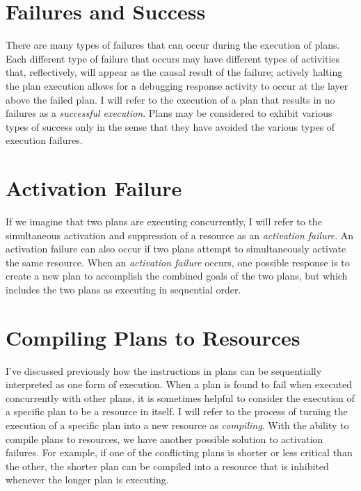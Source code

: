 \section{Failures and Success}

There are many types of failures that can occur during the execution
of plans.  Each different type of failure that occurs may have
different types of activities that, reflectively, will appear as the
causal result of the failure; actively halting the plan execution
allows for a debugging response activity to occur at the layer above
the failed plan.  I will refer to the execution of a plan that results
in no failures as a \emph{successful execution}.  Plans may be
considered to exhibit various types of success only in the sense that
they have avoided the various types of execution failures.

\section{Activation Failure}

If we imagine that two plans are executing concurrently, I will refer
to the simultaneous activation and suppression of a resource as an
\emph{activation failure}.  An activation failure can also occur if
two plans attempt to simultaneously activate the same resource.  When
an \emph{activation failure} occurs, one possible response is to
create a new plan to accomplish the combined goals of the two plans,
but which includes the two plans as executing in sequential order.

\section{Compiling Plans to Resources}

I've discussed previously how the instructions in plans can be
sequentially interpreted as one form of execution.  When a plan is
found to fail when executed concurrently with other plans, it is
sometimes helpful to consider the execution of a specific plan to be a
resource in itself.  I will refer to the process of turning the
execution of a specific plan into a new resource as \emph{compiling}.
With the ability to compile plans to resources, we have another
possible solution to activation failures.  For example, if one of the
conflicting plans is shorter or less critical than the other, the
shorter plan can be compiled into a resource that is inhibited
whenever the longer plan is executing.

